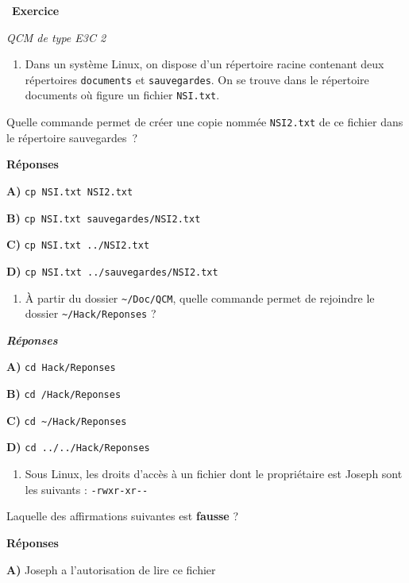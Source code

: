 \documentclass[
  11pt,
]{article}
\providecommand{\tightlist}{%
  \setlength{\itemsep}{0pt}\setlength{\parskip}{0pt}}
\newcounter{exo}
\newenvironment{exercice}[1]
{\par \medskip   \addtocounter{exo}{1} \noindent  
\begin{bclogo}[arrondi =0.1,   noborder = true, logo=\bccrayon, marge=4]{~\textbf{Exercice} \textbf{\theexo} {\itshape #1} }  \par}
{
\end{bclogo}
 \par \bigskip }
\newcounter{prop}
\newcounter{def}
\begin{document}
\begin{exercice}{}

\emph{QCM de type E3C 2}

\begin{enumerate}
\def\labelenumi{\arabic{enumi}.}
\tightlist
\item
  Dans un système Linux, on dispose d'un répertoire racine contenant
  deux répertoires \texttt{documents} et \texttt{sauvegardes}. On se
  trouve dans le répertoire documents où figure un fichier
  \texttt{NSI.txt}.
\end{enumerate}

Quelle commande permet de créer une copie nommée \texttt{NSI2.txt} de ce
fichier dans le répertoire sauvegardes~?

\textbf{Réponses}

\textbf{A)} \texttt{cp\ NSI.txt\ NSI2.txt}

\textbf{B)} \texttt{cp\ NSI.txt\ sauvegardes/NSI2.txt}

\textbf{C)} \texttt{cp\ NSI.txt\ ../NSI2.txt}

\textbf{D)} \texttt{cp\ NSI.txt\ ../sauvegardes/NSI2.txt}

\begin{enumerate}
\def\labelenumi{\arabic{enumi}.}
\setcounter{enumi}{1}
\tightlist
\item
  À partir du dossier \texttt{\textasciitilde{}/Doc/QCM}, quelle
  commande permet de rejoindre le dossier
  \texttt{\textasciitilde{}/Hack/Reponses} ?
\end{enumerate}

\textbf{\emph{Réponses}}

\textbf{A)} \texttt{cd\ Hack/Reponses}

\textbf{B)} \texttt{cd\ /Hack/Reponses}

\textbf{C)} \texttt{cd\ \textasciitilde{}/Hack/Reponses}

\textbf{D)} \texttt{cd\ ../../Hack/Reponses}

\begin{enumerate}
\def\labelenumi{\arabic{enumi}.}
\setcounter{enumi}{2}
\tightlist
\item
  Sous Linux, les droits d'accès à un fichier dont le propriétaire est
  Joseph sont les suivants : \texttt{-rwxr-xr-\/-}
\end{enumerate}

Laquelle des affirmations suivantes est \textbf{fausse} ?

\textbf{Réponses}

\textbf{A)} Joseph a l'autorisation de lire ce fichier


\end{exercice}
\end{document}

